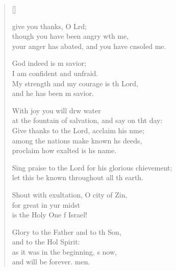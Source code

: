 \settowidth{\versewidth}{Sing praise to the Lord for his glorious achievement.}
\begin{verse}[\versewidth]
  \begin{patverse}
     give you thanks, O Lrd;\Flex\\
though you have been angry w\pointup{\i}th me,\Med\\
your anger has abated, and you have cnsoled me.

God indeed is m savior;\Med\\
I am confident and unfraid.\\
My strength and my courage is th Lord,\Med\\
and he has been m savior.

With joy you will drw water\Med\\
at the fountain of salvation, and say on tht day:\\
Give thanks to the Lord, acclaim his nme;\Flex\\
among the nations make known h\pointup{\i}s deeds,\Med\\
proclaim how exalted is h\pointup{\i}s name.

Sing praise to the Lord for his glorious chievement;\Med\\
let this be known throughout all th earth.

Shout with exultation, O city of Zin,\Flex\\
for great in yur midst\Med\\
is the Holy One f Israel!

Glory to the Father and to th Son,\Med\\
and to the Hol Spirit:\\
as it was in the beginning, \pointup{\i}s now,\Med\\
and will be forever. men. 
  \end{patverse}
\end{verse}
